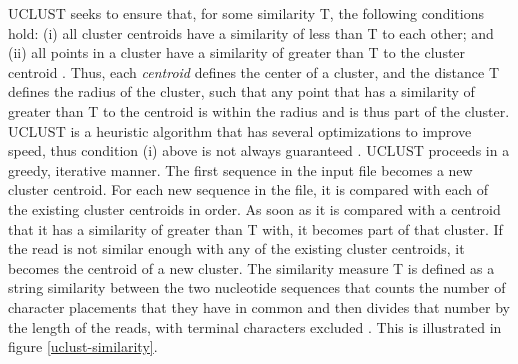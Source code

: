 UCLUST seeks to ensure that, for some similarity T, the following conditions hold: (i) all cluster centroids have a similarity of less than T to each other; and (ii) all points in a cluster have a similarity of greater than T to the cluster centroid \cite{Edgar10}. Thus, each \emph{centroid} defines the center of a cluster, and the distance T defines the radius of the cluster, such that any point that has a similarity of greater than T to the centroid is within the radius and is thus part of the cluster. UCLUST is a heuristic algorithm that has several optimizations to improve speed, thus condition (i) above is not always guaranteed \cite{Edgar10}. UCLUST proceeds in a greedy, iterative manner. The first sequence in the input file becomes a new cluster centroid. For each new sequence in the file, it is compared with each of the existing cluster centroids in order. As soon as it is compared with a centroid that it has a similarity of greater than T with, it becomes part of that cluster. If the read is not similar enough with any of the existing cluster centroids, it becomes the centroid of a new cluster. The similarity measure T is defined as a string similarity between the two nucleotide sequences that counts the number of character placements that they have in common and then divides that number by the length of the reads, with terminal characters excluded \cite{Edgar10}. This is illustrated in figure \ref{uclust-similarity}.